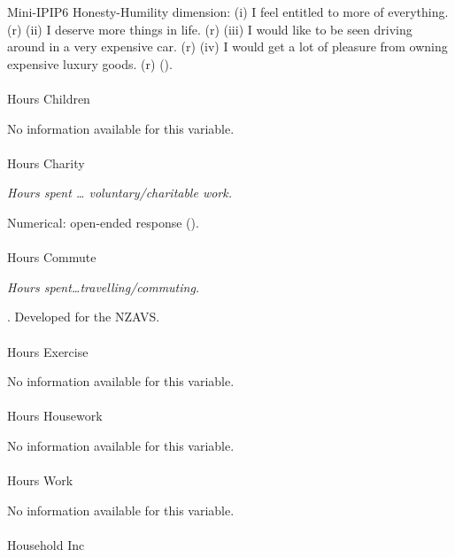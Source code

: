\documentclass[
  single column]{article}
\makeatletter
\let\oldparagraph\paragraph
\renewcommand{\paragraph}{
    \@ifstar
      \xxxParagraphStar
      \xxxParagraphNoStar
  }
\newcommand{\xxxParagraphStar}[1]{\oldparagraph*{#1}\mbox{}}
\newcommand{\xxxParagraphNoStar}[1]{\oldparagraph{#1}\mbox{}}
\makeatother
\begin{document}
Mini-IPIP6 Honesty-Humility dimension: (i) I feel entitled to more of
everything. (r) (ii) I deserve more things in life. (r) (iii) I would
like to be seen driving around in a very expensive car. (r) (iv) I would
get a lot of pleasure from owning expensive luxury goods. (r)
().

\paragraph{Hours Children}\label{hours-children}

No information available for this variable.

\paragraph{Hours Charity}\label{hours-charity}

\emph{Hours spent \ldots{} voluntary/charitable work.}

Numerical: open-ended response ().

\paragraph{Hours Commute}\label{hours-commute}

\emph{Hours spent\ldots travelling/commuting.}

. Developed for the NZAVS.

\paragraph{Hours Exercise}\label{hours-exercise}

No information available for this variable.

\paragraph{Hours Housework}\label{hours-housework}

No information available for this variable.

\paragraph{Hours Work}\label{hours-work}

No information available for this variable.

\paragraph{Household Inc}\label{household-inc}
\end{document}
